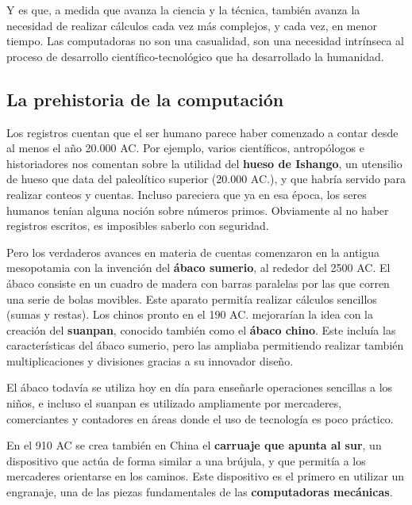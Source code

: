 Y es que, a medida que avanza la ciencia y la técnica, también avanza la necesidad
de realizar cálculos cada vez más complejos, y cada vez, en menor tiempo. Las
computadoras no son una casualidad, son una necesidad intrínseca al proceso de
desarrollo científico-tecnológico que ha desarrollado la humanidad.

\subsection{La prehistoria de la computación}

Los registros cuentan que el ser humano parece haber comenzado a contar desde al
menos el año 20.000 AC. Por ejemplo, varios científicos, antropólogos e
historiadores nos comentan sobre la utilidad del \textbf{hueso de Ishango}, un
utensilio de hueso que data del paleolítico superior (20.000 AC.), y que habría
servido para realizar conteos y cuentas. Incluso pareciera que ya en esa época,
los seres humanos tenían alguna noción sobre números primos. Obviamente al no
haber registros escritos, es imposibles saberlo con seguridad.\autocite{bogoshi_1987}

Pero los verdaderos avances en materia de cuentas comenzaron en la antigua mesopotamia
con la invención del \textbf{ábaco sumerio}, al rededor del 2500 AC. El ábaco
consiste en un cuadro de madera con barras paralelas por las que corren una
serie de bolas movibles. Este aparato permitía realizar cálculos sencillos
(sumas y restas). Los chinos pronto en el 190 AC. mejorarían la idea con la
creación del \textbf{suanpan}, conocido también como el \textbf{ábaco chino}.
Este incluía las características del ábaco sumerio, pero las ampliaba permitiendo
realizar también multiplicaciones y divisiones gracias a su innovador diseño.
\autocite[vid.]{boyer_1991}

\begin{knowwhat}
    El ábaco todavía se utiliza hoy en día para enseñarle operaciones sencillas a
    los niños, e incluso el suanpan es utilizado ampliamente por mercaderes,
    comerciantes y contadores en áreas donde el uso de tecnología es poco práctico.
\end{knowwhat}

En el 910 AC se crea también en China el \textbf{carruaje que apunta al sur}, un
dispositivo que actúa de forma similar a una brújula, y que permitía a los
mercaderes orientarse en los caminos. Este dispositivo es el primero en utilizar
un engranaje, una de las piezas fundamentales de las \textbf{computadoras
mecánicas}.

